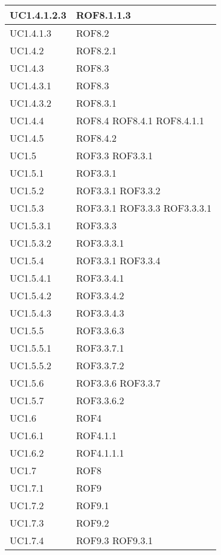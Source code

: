 \begin{center}
\begin{longtable}{| p{4cm} | p{4cm} |}
\hline
UC1.4.1.2.3 & ROF8.1.1.3 \\
\hline
UC1.4.1.3 & ROF8.2 \\
\hline
UC1.4.2 & ROF8.2.1 \\
\hline
UC1.4.3 & ROF8.3 \\
\hline
UC1.4.3.1 & ROF8.3 \\
\hline
UC1.4.3.2 & ROF8.3.1 \\
\hline
UC1.4.4 & ROF8.4 \newline ROF8.4.1 \newline ROF8.4.1.1 \\
\hline
UC1.4.5 & ROF8.4.2 \\
\hline
UC1.5 & ROF3.3 \newline ROF3.3.1 \\
\hline
UC1.5.1 & ROF3.3.1 \\
\hline
UC1.5.2 & ROF3.3.1 \newline ROF3.3.2 \\
\hline
UC1.5.3 & ROF3.3.1 \newline ROF3.3.3 \newline ROF3.3.3.1 \\
\hline
UC1.5.3.1 & ROF3.3.3 \\
\hline
UC1.5.3.2 & ROF3.3.3.1 \\
\hline
UC1.5.4 & ROF3.3.1 \newline ROF3.3.4 \\
\hline
UC1.5.4.1 & ROF3.3.4.1 \\
\hline
UC1.5.4.2 & ROF3.3.4.2 \\
\hline
UC1.5.4.3 & ROF3.3.4.3 \\
\hline
UC1.5.5 & ROF3.3.6.3 \\
\hline
UC1.5.5.1 & ROF3.3.7.1 \\
\hline
UC1.5.5.2 & ROF3.3.7.2 \\
\hline
UC1.5.6 & ROF3.3.6 \newline ROF3.3.7 \\
\hline
UC1.5.7 & ROF3.3.6.2 \\
\hline
UC1.6 & ROF4 \\
\hline
UC1.6.1 & ROF4.1.1 \\
\hline
UC1.6.2 & ROF4.1.1.1 \\
\hline
UC1.7 & ROF8 \\
\hline
UC1.7.1 & ROF9 \\
\hline
UC1.7.2 & ROF9.1 \\
\hline
UC1.7.3 & ROF9.2 \\
\hline
UC1.7.4 & ROF9.3 \newline ROF9.3.1 \\

\end{longtable}
\end{center}
